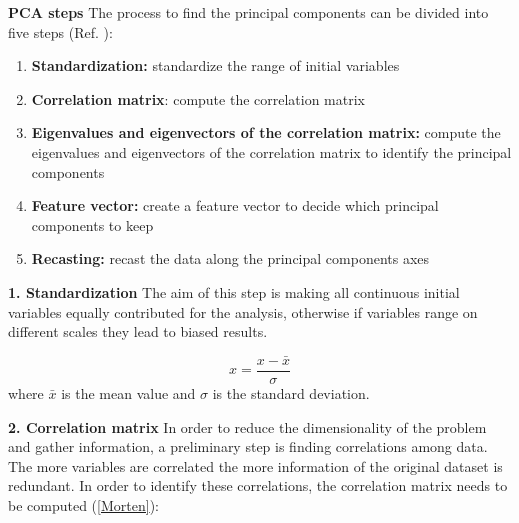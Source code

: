 \documentclass[english,notitlepage,reprint,nofootinbib]{revtex4-1}  %
\begin{document}
\textbf{PCA steps} The process to find the principal components can be divided into five steps (Ref. \cite{pc}):

\begin{enumerate}
    \item \textbf{Standardization:} standardize the range of initial variables
    \item \textbf{Correlation matrix}: compute the correlation matrix
    \item \textbf{Eigenvalues and eigenvectors of the correlation matrix:} compute the eigenvalues and eigenvectors of the correlation matrix to identify the principal components
    \item \textbf{Feature vector:} create a feature vector to decide which principal components to keep
    \item \textbf{Recasting:} recast the data along the principal components axes
\end{enumerate}

\textbf{1. Standardization} The aim of this step is making all continuous initial variables equally contributed for the analysis, otherwise if variables range on different scales they lead to biased results.

\begin{equation}
    x = \frac{x -\bar{x}}{\sigma}
\end{equation}
where $\bar{x}$ is the mean value and $\sigma$ is the standard deviation.

\textbf{2. Correlation matrix} In order to reduce the dimensionality of the problem and gather information, a preliminary step is finding correlations among data. The more variables are correlated the more information of the original dataset is redundant. In order to identify these correlations, the correlation matrix needs to be computed (\ref{Morten}):

\end{document}
